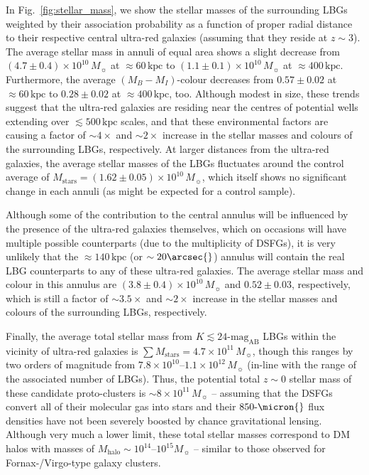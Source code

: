 \documentclass[a4paper, fleqn, usenatbib]{mnras}
\newcommand{\kiloparsec}{\text{kpc}}
\newcommand{\magab}{\text{mag}_{\text{AB}}}
\newcommand{\mhalo}{M_{\text{halo}}}
\newcommand{\msol}{M_{\sun}}
\newcommand{\mstars}{M_{\text{stars}}}
\newcommand{\urgs}{ultra-red galaxies}
\begin{document}
In Fig.~\ref{fig:stellar_mass}, we show the stellar masses of the surrounding LBGs weighted by their association probability as a function of proper radial distance to their respective central \urgs{} (assuming that they reside at $z\sim3$).
The average stellar mass in annuli of equal area shows a slight decrease from $(4.7\pm0.4)\times10^{10}\,\msol{}$ at $\approx60\,\kiloparsec{}$ to $(1.1\pm0.1)\times10^{10}\,\msol{}$ at $\approx400\,\kiloparsec{}$.
Furthermore, the average $(M_{B}-M_{I})$-colour decreases from $0.57\pm0.02$ at $\approx60\,\kiloparsec{}$ to $0.28\pm0.02$ at $\approx400\,\kiloparsec{}$, too.
Although modest in size, these trends suggest that the \urgs{} are residing near the centres of potential wells extending over $\lesssim500\,\kiloparsec{}$ scales, and that these environmental factors are causing a factor of $\sim4\times$ and $\sim2\times$ increase in the stellar masses and colours of the surrounding LBGs, respectively.
At larger distances from the \urgs{}, the average stellar masses of the LBGs fluctuates around the control average of $\mstars{}=(1.62\pm0.05)\times10^{10}\,\msol{}$, which itself shows no significant change in each annuli (as might be expected for a control sample).

Although some of the contribution to the central annulus will be influenced by the presence of the \urgs{} themselves, which on occasions will have multiple possible counterparts (due to the multiplicity of DSFGs), it is very unlikely that the $\approx140\,\kiloparsec{}$ (or $\sim20\arcsec{}$) annulus will contain the real LBG counterparts to any of these \urgs{}.
The average stellar mass and colour in this annulus are $(3.8\pm0.4)\times10^{10}\,\msol{}$ and $0.52\pm0.03$, respectively, which is still a factor of $\sim3.5\times$ and $\sim2\times$ increase in the stellar masses and colours of the surrounding LBGs, respectively.

Finally, the average total stellar mass from $K\lesssim24\text{-}\magab{}$ LBGs within the vicinity of \urgs{} is $\sum \mstars{}=4.7\times10^{11}\,\msol{}$, though this ranges by two orders of magnitude from $7.8\times10^{10}\text{--}1.1\times10^{12}\,\msol{}$ (in-line with the range of the associated number of LBGs).
Thus, the potential total $z\sim0$ stellar mass of these candidate proto-clusters is $\sim8\times10^{11}\,\msol{}$ -- assuming that the DSFGs convert all of their molecular gas into stars and their $850\text{-}\micron{}$ flux densities have not been severely boosted by chance gravitational lensing.
Although very much a lower limit, these total stellar masses correspond to DM halos with masses of $\mhalo{}\sim10^{14}\text{--}10^{15}\msol{}$ \citep{behroozi13} -- similar to those observed for Fornax-/Virgo-type galaxy clusters.
\end{document}
